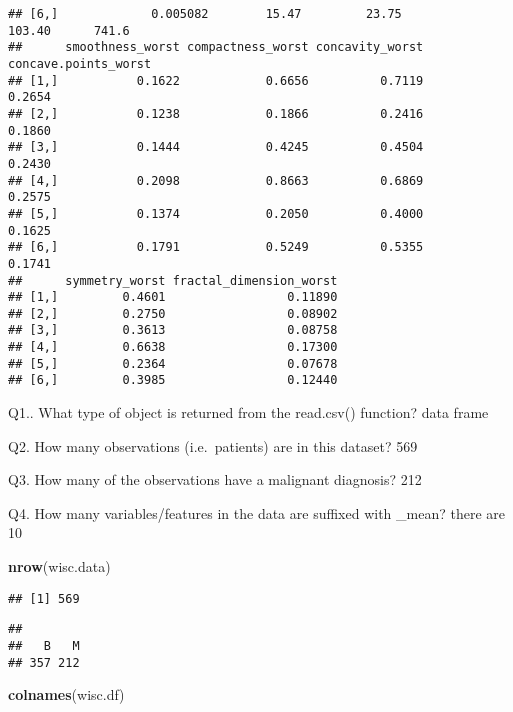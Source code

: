 \documentclass[
]{article}
\newenvironment{Shaded}{\begin{snugshade}}{\end{snugshade}}
\newcommand{\KeywordTok}[1]{\textcolor[rgb]{0.13,0.29,0.53}{\textbf{#1}}}
\newcommand{\NormalTok}[1]{#1}
\newcommand{\OperatorTok}[1]{\textcolor[rgb]{0.81,0.36,0.00}{\textbf{#1}}}
\begin{document}
\begin{verbatim}
## [6,]             0.005082        15.47         23.75          103.40      741.6
##      smoothness_worst compactness_worst concavity_worst concave.points_worst
## [1,]           0.1622            0.6656          0.7119               0.2654
## [2,]           0.1238            0.1866          0.2416               0.1860
## [3,]           0.1444            0.4245          0.4504               0.2430
## [4,]           0.2098            0.8663          0.6869               0.2575
## [5,]           0.1374            0.2050          0.4000               0.1625
## [6,]           0.1791            0.5249          0.5355               0.1741
##      symmetry_worst fractal_dimension_worst
## [1,]         0.4601                 0.11890
## [2,]         0.2750                 0.08902
## [3,]         0.3613                 0.08758
## [4,]         0.6638                 0.17300
## [5,]         0.2364                 0.07678
## [6,]         0.3985                 0.12440
\end{verbatim}

Q1.. What type of object is returned from the read.csv() function? data
frame

Q2. How many observations (i.e.~patients) are in this dataset? 569

Q3. How many of the observations have a malignant diagnosis? 212

Q4. How many variables/features in the data are suffixed with \_mean?
there are 10

\begin{Shaded}
\begin{Highlighting}[]
\KeywordTok{nrow}\NormalTok{(wisc.data)}
\end{Highlighting}
\end{Shaded}

\begin{verbatim}
## [1] 569
\end{verbatim}

\begin{Shaded}
\end{Shaded}

\begin{verbatim}
## 
##   B   M 
## 357 212
\end{verbatim}

\begin{Shaded}
\begin{Highlighting}[]
\KeywordTok{colnames}\NormalTok{(wisc.df)}
\end{Highlighting}
\end{Shaded}
\end{document}
